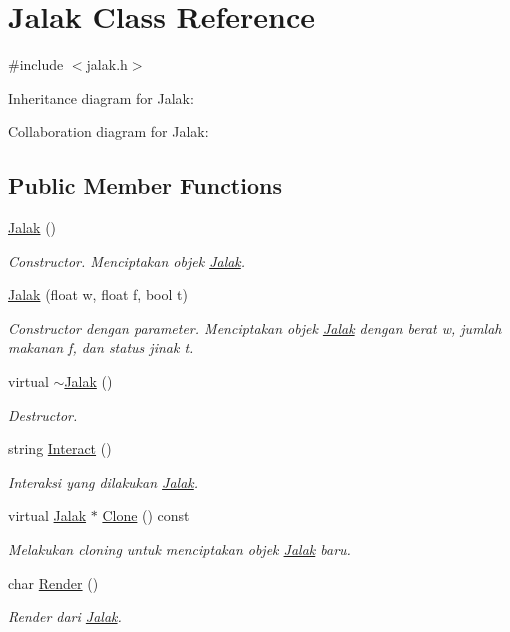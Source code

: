 \hypertarget{classJalak}{}\section{Jalak Class Reference}
\label{classJalak}


{\ttfamily \#include $<$jalak.\+h$>$}



Inheritance diagram for Jalak\+:


Collaboration diagram for Jalak\+:
\subsection*{Public Member Functions}
\begin{DoxyCompactItemize}
\item 
\hyperlink{classJalak_a3887e1118830188e1aeffee215b2816f}{Jalak} ()
\begin{DoxyCompactList}\small\item\em Constructor. Menciptakan objek \hyperlink{classJalak}{Jalak}. \end{DoxyCompactList}\item 
\hyperlink{classJalak_a12f97db5ae28b059a948c7f52f5eb002}{Jalak} (float w, float f, bool t)
\begin{DoxyCompactList}\small\item\em Constructor dengan parameter. Menciptakan objek \hyperlink{classJalak}{Jalak} dengan berat w, jumlah makanan f, dan status jinak t. \end{DoxyCompactList}\item 
virtual \hyperlink{classJalak_a2c1e4e68ab9126c034520c2c845a5afa}{$\sim$\+Jalak} ()
\begin{DoxyCompactList}\small\item\em Destructor. \end{DoxyCompactList}\item 
string \hyperlink{classJalak_a864b931f04f1580759c4a108e1734bb8}{Interact} ()
\begin{DoxyCompactList}\small\item\em Interaksi yang dilakukan \hyperlink{classJalak}{Jalak}. \end{DoxyCompactList}\item 
virtual \hyperlink{classJalak}{Jalak} $\ast$ \hyperlink{classJalak_a85b145221386cdca75274b4438250161}{Clone} () const 
\begin{DoxyCompactList}\small\item\em Melakukan cloning untuk menciptakan objek \hyperlink{classJalak}{Jalak} baru. \end{DoxyCompactList}\item 
char \hyperlink{classJalak_af500189104401b66d6ab4e3b1106ce74}{Render} ()
\begin{DoxyCompactList}\small\item\em Render dari \hyperlink{classJalak}{Jalak}. \end{DoxyCompactList}\end{DoxyCompactItemize}
